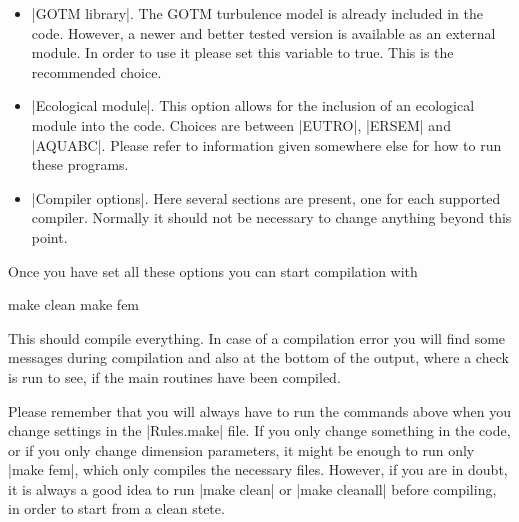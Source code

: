 \begin{itemize}
\item |GOTM library|. The GOTM turbulence model is already included
in the code. However, a newer and better tested version is available
as an external module. In order to use it please set this variable to
true. This is the recommended choice.

\item |Ecological module|. This option allows for the inclusion of an
ecological module into the code. Choices are between |EUTRO|, |ERSEM|
and |AQUABC|. Please refer to information given somewhere else for how
to run these programs.

\item |Compiler options|. Here several sections are present, one for
each supported compiler. Normally it should not be necessary to change
anything beyond this point.

\end{itemize}

Once you have set all these options you can start compilation with

\begin{code}
    make clean
    make fem
\end{code}

This should compile everything. In case of a compilation error you will
find some messages during compilation and also at the bottom of the output,
where a check is run to see, if the main routines have been compiled.

Please remember that you will always have to run the commands above
when you change settings in the |Rules.make| file. If you only change
something in the code, or if you only change dimension parameters, it
might be enough to run only |make fem|, which only compiles the necessary
files. However, if you are in doubt, it is always a good idea to run
|make clean| or |make cleanall| before compiling, in order to start from
a clean stete.

